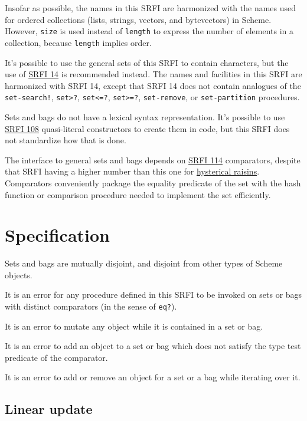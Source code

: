Insofar as possible, the names in this SRFI are harmonized with the
names used for ordered collections (lists, strings, vectors, and
bytevectors) in Scheme. However, \texttt{size} is used instead of
\texttt{length} to express the number of elements in a collection,
because \texttt{length} implies order.

It's possible to use the general sets of this SRFI to contain
characters, but the use of
\href{http://srfi.schemers.org/srfi-14/srfi-14.html}{SRFI 14} is
recommended instead. The names and facilities in this SRFI are
harmonized with SRFI 14, except that SRFI 14 does not contain analogues
of the \texttt{set-search!}, \texttt{set\textgreater{}?},
\texttt{set\textless{}=?}, \texttt{set\textgreater{}=?},
\texttt{set-remove}, or \texttt{set-partition} procedures.

Sets and bags do not have a lexical syntax representation. It's possible
to use \href{http://srfi.schemers.org/srfi-108/srfi-108.html}{SRFI 108}
quasi-literal constructors to create them in code, but this SRFI does
not standardize how that is done.

The interface to general sets and bags depends on
\href{http://srfi.schemers.org/srfi-114/srfi-114.html}{SRFI 114}
comparators, despite that SRFI having a higher number than this one for
\href{http://www.catb.org/jargon/html/H/hysterical-reasons.html}{hysterical
raisins}. Comparators conveniently package the equality predicate of the
set with the hash function or comparison procedure needed to implement
the set efficiently.

\section{Specification}\label{specification}

Sets and bags are mutually disjoint, and disjoint from other types of
Scheme objects.

It is an error for any procedure defined in this SRFI to be invoked on
sets or bags with distinct comparators (in the sense of \texttt{eq?}).

It is an error to mutate any object while it is contained in a set or
bag.

It is an error to add an object to a set or bag which does not satisfy
the type test predicate of the comparator.

It is an error to add or remove an object for a set or a bag while
iterating over it.

\subsection{Linear update}\label{linear-update}

